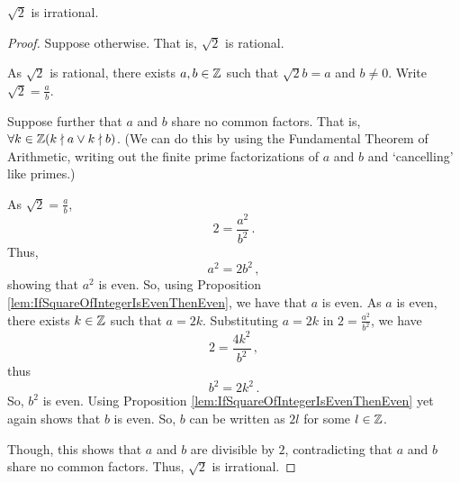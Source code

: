 \guard









\begin{thm}
\label{thm:rootTwoIrrational}
  $\sqrt{2}$ is irrational.
\end{thm}
\begin{proof}
  Suppose otherwise.
  That is, $\sqrt{2}$ is rational.

  As $\sqrt{2}$ is rational, there exists $a,b\in\mathbb{Z}$ such that $\sqrt{2}b=a$ and $b\not=0$.
  Write $\sqrt{2}=\frac{a}{b}$.

  Suppose further that $a$ and $b$ share no common factors.
  That is, $\forall k\in\mathbb{Z}( k\nmid a \vee k\nmid b)$.
  (We can do this by using the Fundamental Theorem of Arithmetic, writing out the finite prime factorizations of $a$ and $b$ and `cancelling' like primes.)

  As $\sqrt{2}=\frac{a}{b}$, \[ 2 = \frac{a^2}{b^2}\,.\]
  Thus, \[ a^2 = 2b^2\,,\]
  showing that $a^2$ is even.
  So, using Proposition \ref{lem:IfSquareOfIntegerIsEvenThenEven}, we have that $a$ is even.
  As $a$ is even, there exists $k\in\mathbb{Z}$ such that $a=2k$.
  Substituting $a=2k$ in $2 = \frac{a^2}{b^2}$, we have \[ 2 = \frac{4k^2}{b^2}\,,\] thus \[ b^2 = 2k^2\,.\]
  So, $b^2$ is even.
  Using Proposition \ref{lem:IfSquareOfIntegerIsEvenThenEven} yet again shows that $b$ is even.
  So, $b$ can be written as $2l$ for some $l\in\mathbb{Z}$.

  Though, this shows that $a$ and $b$ are divisible by $2$, contradicting that $a$ and $b$ share no common factors.
  Thus, $\sqrt{2}$ is irrational.
\end{proof}
